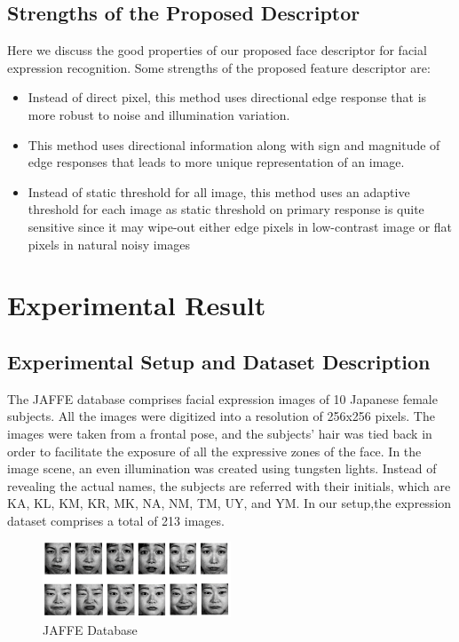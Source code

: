 \documentclass[12pt]{article}
\begin{document}
\subsection{Strengths of the Proposed Descriptor}
Here we discuss the good properties of our proposed face descriptor for facial expression
recognition. Some strengths of the proposed feature descriptor are:
\begin{itemize}
	\item Instead of direct pixel, this method uses directional edge response that is more robust to noise and illumination variation.
	\item This method uses directional information along with sign and magnitude of edge responses that leads to more unique representation of an image.
	\item Instead of static threshold for all image, this method uses an adaptive threshold for each image as static threshold on primary response is quite sensitive since it may wipe-out either edge pixels in low-contrast image or flat pixels in natural noisy images
	\end {itemize}
	
	
	

\newpage
\section{Experimental Result}
\subsection{Experimental Setup and Dataset Description}
The JAFFE database \cite{lyons1998coding} comprises facial expression images of 10 Japanese female subjects. All the images were digitized into a resolution of 256x256 pixels. The
images were taken from a frontal pose, and the subjects' hair was tied back in
order to facilitate the exposure of all the expressive zones of the face. In the
image scene, an even illumination was created using tungsten lights. Instead of
revealing the actual names, the subjects are referred with their initials, which are KA, KL, KM, KR, MK, NA, NM, TM, UY, and YM. In our setup,the expression dataset comprises a total of 213 images.\\

\begin{figure}[h]	
	\centering
	\includegraphics[width=0.5\textwidth]{jaffe}
	\caption{JAFFE Database}		
\end{figure}
\end{document}
